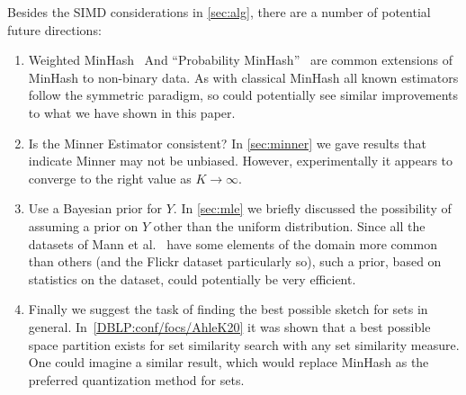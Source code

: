 Besides the SIMD considerations in \cref{sec:alg}, there are a number of potential future directions:
\begin{enumerate}
   \item Weighted MinHash~\cite{ioffe2010improved} And ``Probability MinHash''~\cite{moulton2018maximally} are common extensions of MinHash to non-binary data.
      As with classical MinHash all known estimators follow the symmetric paradigm, so could potentially see similar improvements to what we have shown in this paper.
   \item Is the Minner Estimator consistent? In \cref{sec:minner} we gave results that indicate Minner may not be unbiased.
      However, experimentally it appears to converge to the right value as $K\to\infty$.
   \item Use a Bayesian prior for $Y$.
      In \cref{sec:mle} we briefly discussed the possibility of assuming a prior on $Y$ other than the uniform distribution.
      Since all the datasets of Mann et al.~\cite{mann2016empirical} have some elements of the domain more common than others (and the Flickr dataset particularly so), such a prior, based on statistics on the dataset, could potentially be very efficient.
   \item Finally we suggest the task of finding the best possible sketch for sets in general.
      In~\cref{DBLP:conf/focs/AhleK20} it was shown that a best possible space partition exists for set similarity search with any set similarity measure.
      One could imagine a similar result, which would replace MinHash as the preferred quantization method for sets.
\end{enumerate}



